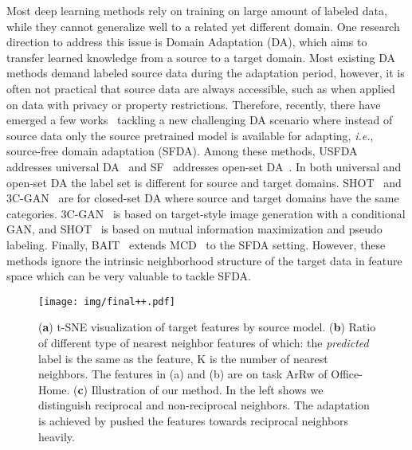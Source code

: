 \documentclass{article}
\begin{document}
Most deep learning methods rely on training on large amount of labeled data, while they cannot generalize well to a related yet different domain. One research direction to address this issue is Domain Adaptation (DA), which aims to transfer learned knowledge from a source to a target domain. Most existing DA methods demand labeled source data during the adaptation period, however, it is often not practical that source data are always accessible, such as when applied on data with privacy or property restrictions. Therefore, recently, there have emerged a few works~\cite{kundu2020universal,kundu2020towards,li2020model,liang2020we} tackling a new challenging DA scenario where instead of source data only the source pretrained model is available for adapting, \textit{i.e.}, source-free domain adaptation (SFDA). Among these methods, USFDA~\cite{kundu2020universal} addresses universal DA~\cite{you2019universal} and SF~\cite{kundu2020towards} addresses open-set DA~\cite{saito2018open}. In both universal and open-set DA the label set is different for source and target domains. SHOT~\cite{liang2020we} and 3C-GAN~\cite{li2020model} are for closed-set DA where source and target domains have the same categories. 3C-GAN~\cite{li2020model} is based on target-style image generation with a conditional GAN, and SHOT~\cite{liang2020we} is based on mutual information maximization and pseudo labeling. {Finally, BAIT~\cite{yang2020unsupervised} extends MCD~\cite{saito2018maximum} to the SFDA setting.}
However, these methods ignore the intrinsic neighborhood structure of the target data in feature space which can be very valuable to tackle SFDA. 




\begin{figure}[tbp]
\centering
	\texttt{[image: img/final++.pdf]}
\caption{(\textbf{a}) t-SNE visualization of target features by source model. (\textbf{b}) Ratio of different type of nearest neighbor features of which: the \textit{predicted} label is the same as the feature, K is the number of nearest neighbors. The features in (a) and (b) are on task ArRw of Office-Home.   (\textbf{c}) Illustration of our method. In the left shows we distinguish reciprocal and non-reciprocal neighbors. The adaptation is achieved by pushed the features towards reciprocal neighbors heavily. 
\vspace{-2mm}}
	\label{fig:motivation}
	\vspace{-2mm}
\end{figure}
\end{document}
